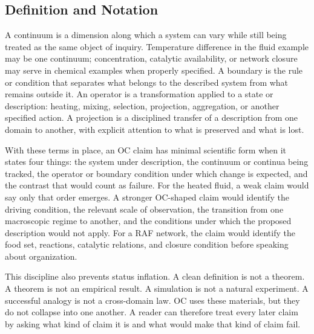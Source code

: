 \documentclass[11pt,a4paper,openany]{book}
\begin{document}
\subsection{Definition and Notation}
A continuum is a dimension along which a system can vary while still being treated as the same object of inquiry. Temperature difference in the fluid example may be one continuum; concentration, catalytic availability, or network closure may serve in chemical examples when properly specified. A boundary is the rule or condition that separates what belongs to the described system from what remains outside it. An operator is a transformation applied to a state or description: heating, mixing, selection, projection, aggregation, or another specified action. A projection is a disciplined transfer of a description from one domain to another, with explicit attention to what is preserved and what is lost. \cite{haken_synergetics,nicolis_prigogine_selforg}\par
With these terms in place, an OC claim has minimal scientific form when it states four things: the system under description, the continuum or continua being tracked, the operator or boundary condition under which change is expected, and the contrast that would count as failure. For the heated fluid, a weak claim would say only that order emerges. A stronger OC-shaped claim would identify the driving condition, the relevant scale of observation, the transition from one macroscopic regime to another, and the conditions under which the proposed description would not apply. For a RAF network, the claim would identify the food set, reactions, catalytic relations, and closure condition before speaking about organization.\par
This discipline also prevents status inflation. A clean definition is not a theorem. A theorem is not an empirical result. A simulation is not a natural experiment. A successful analogy is not a cross-domain law. OC uses these materials, but they do not collapse into one another. A reader can therefore treat every later claim by asking what kind of claim it is and what would make that kind of claim fail.\par
\end{document}
